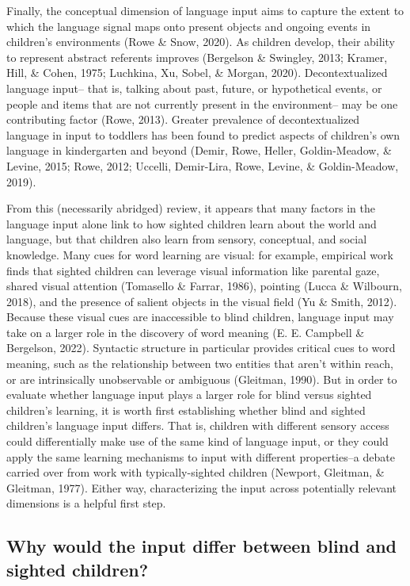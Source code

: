 \documentclass[
  man,floatsintext]{apa6}
\begin{document}
Finally, the conceptual dimension of language input aims to capture the extent to which the language signal maps onto present objects and ongoing events in children's environments (Rowe \& Snow, 2020). As children develop, their ability to represent abstract referents improves (Bergelson \& Swingley, 2013; Kramer, Hill, \& Cohen, 1975; Luchkina, Xu, Sobel, \& Morgan, 2020). Decontextualized language input-- that is, talking about past, future, or hypothetical events, or people and items that are not currently present in the environment-- may be one contributing factor (Rowe, 2013). Greater prevalence of decontextualized language in input to toddlers has been found to predict aspects of children's own language in kindergarten and beyond (Demir, Rowe, Heller, Goldin-Meadow, \& Levine, 2015; Rowe, 2012; Uccelli, Demir-Lira, Rowe, Levine, \& Goldin-Meadow, 2019).

From this (necessarily abridged) review, it appears that many factors in the language input alone link to how sighted children learn about the world and language, but that children also learn from sensory, conceptual, and social knowledge. Many cues for word learning are visual: for example, empirical work finds that sighted children can leverage visual information like parental gaze, shared visual attention (Tomasello \& Farrar, 1986), pointing (Lucca \& Wilbourn, 2018), and the presence of salient objects in the visual field (Yu \& Smith, 2012). Because these visual cues are inaccessible to blind children, language input may take on a larger role in the discovery of word meaning (E. E. Campbell \& Bergelson, 2022). Syntactic structure in particular provides critical cues to word meaning, such as the relationship between two entities that aren't within reach, or are intrinsically unobservable or ambiguous (Gleitman, 1990). But in order to evaluate whether language input plays a larger role for blind versus sighted children's learning, it is worth first establishing whether blind and sighted children's language input differs. That is, children with different sensory access could differentially make use of the same kind of language input, or they could apply the same learning mechanisms to input with different properties--a debate carried over from work with typically-sighted children (Newport, Gleitman, \& Gleitman, 1977). Either way, characterizing the input across potentially relevant dimensions is a helpful first step.

\hypertarget{why-would-the-input-differ-between-blind-and-sighted-children}{%
\subsection{Why would the input differ between blind and sighted children?}\label{why-would-the-input-differ-between-blind-and-sighted-children}}
\end{document}
